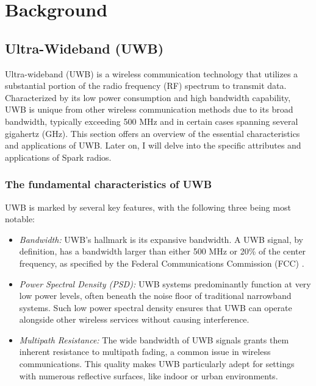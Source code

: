\chapter{Background}
\label{cha:background} 

\section{Ultra-Wideband (UWB)}
\label{sec:UWB}
Ultra-wideband (UWB) is a wireless communication technology that utilizes a substantial portion of the radio frequency (RF) spectrum to transmit data. Characterized by its low power consumption and high bandwidth capability, UWB is unique from other wireless communication methods due to its broad bandwidth, typically exceeding 500 MHz and in certain cases spanning several gigahertz (GHz)\cite{what_is_UWB}. This section offers an overview of the essential characteristics and applications of UWB. Later on, I will delve into the specific attributes and applications of Spark radios.

\subsection{The fundamental characteristics of UWB}
\label{UWB_fundamental_characteristics}
UWB is marked by several key features, with the following three being most notable:
\begin{itemize}
    \item \textit{Bandwidth:} UWB's hallmark is its expansive bandwidth. A UWB signal, by definition, has a bandwidth larger than either 500 MHz or 20\% of the center frequency, as specified by the Federal Communications Commission (FCC) \cite{FCC}.
    \item \textit{Power Spectral Density (PSD):} UWB systems predominantly function at very low power levels, often beneath the noise floor of traditional narrowband systems. Such low power spectral density ensures that UWB can operate alongside other wireless services without causing interference\cite{paper_UWB_characteristics}.
    \item \textit{Multipath Resistance:} The wide bandwidth of UWB signals grants them inherent resistance to multipath fading, a common issue in wireless communications. This quality makes UWB particularly adept for settings with numerous reflective surfaces, like indoor or urban environments\cite{paper_UWB_characteristics}.

\end{itemize}


